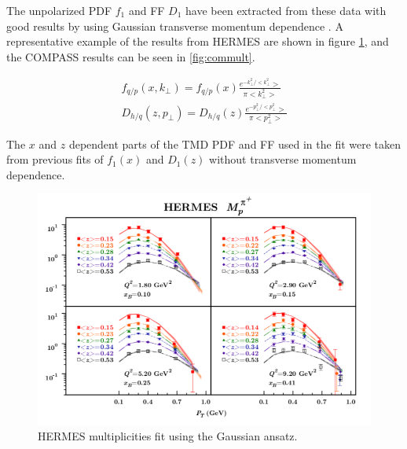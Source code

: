 The unpolarized PDF $f_1$ and FF $D_1$ have been extracted from these data with good results by using Gaussian transverse momentum dependence \cite{tmds-anselmino:2013}.  A representative example of the results from HERMES are shown in figure \ref{fig:hermult}, and the COMPASS results can be seen in \ref{fig:commult}.

\begin{gather}\label{eqn:gaussian-ansatz}
	f_{q/p} (x, k_{\perp}) = f_{q/p} (x) \frac{e^{-k_{\perp}^2 / <k_{\perp}^2}>}{\pi <k_{\perp}^2>} \\ 
	D_{h/q} (z, p_{\perp}) = D_{h/q} (z) \frac{e^{-p_{\perp}^2 / <p_{\perp}^2}>}{\pi <p_{\perp}^2>} 
\end{gather}

The $x$ and $z$ dependent parts of the TMD PDF and FF used in the fit were taken from previous fits of $f_1(x)$ and $D_1(z)$ without transverse momentum dependence.

\begin{figure}
	\centering
	\includegraphics[width=\textwidth]{image/plots/introduction/hermes_multi_fit.png}
	\caption{HERMES multiplicities fit using the Gaussian ansatz.}
	\label{fig:hermult}
\end{figure}

